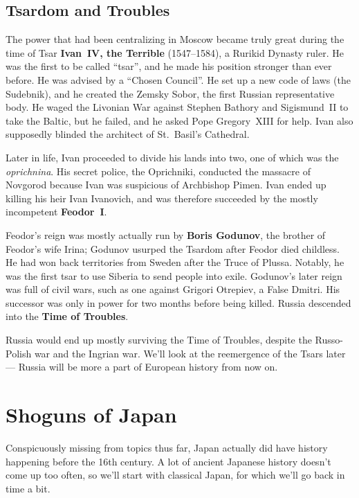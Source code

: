 \subsection*{Tsardom and Troubles}

The power that had been centralizing in Moscow became truly great during the time of
Tsar \textbf{Ivan~IV, the Terrible} (1547--1584), a Rurikid Dynasty ruler.
He was the first to be called ``tsar'', and he made his position stronger than ever before.
He was advised by a ``Chosen Council''.
He set up a new code of laws (the Sudebnik), and he created the Zemsky Sobor, the first Russian representative body.
He waged the Livonian War against Stephen Bathory and Sigismund~II to take the Baltic,
but he failed, and he asked Pope Gregory~XIII for help.
Ivan also supposedly blinded the architect of St.\ Basil's Cathedral.

Later in life, Ivan proceeded to divide his lands into two, one of which was the \textit{oprichnina}.
His secret police, the Oprichniki, conducted the massacre of Novgorod because Ivan was suspicious of Archbishop Pimen.
Ivan ended up killing his heir Ivan Ivanovich,
and was therefore succeeded by the mostly incompetent \textbf{Feodor~I}.

Feodor's reign was mostly actually run by \textbf{Boris Godunov}, the brother of Feodor's wife Irina;
Godunov usurped the Tsardom after Feodor died childless.
He had won back territories from Sweden after the Truce of Plussa.
Notably, he was the first tsar to use Siberia to send people into exile.
Godunov's later reign was full of civil wars, such as one against Grigori Otrepiev, a False Dmitri.
His successor was only in power for two months before being killed.
Russia descended into the \textbf{Time of Troubles}.

Russia would end up mostly surviving the Time of Troubles, despite the Russo-Polish war and the Ingrian war.
We'll look at the reemergence of the Tsars later --- Russia will be more a part of European history from now on.

\section{Shoguns of Japan}

Conspicuously missing from topics thus far,
Japan actually did have history happening before the 16th century.
A lot of ancient Japanese history doesn't come up too often,
so we'll start with classical Japan, for which we'll go back in time a bit.

